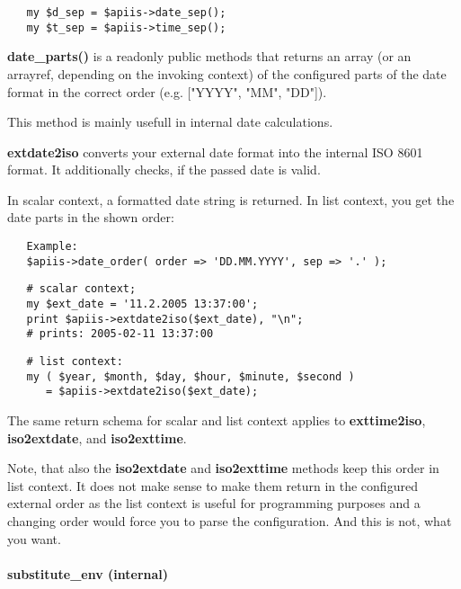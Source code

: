 \begin{verbatim}
   my $d_sep = $apiis->date_sep();
   my $t_sep = $apiis->time_sep();
\end{verbatim}


\textbf{date\_parts()} is a readonly public methods that returns an array (or an
arrayref, depending on the invoking context) of the configured parts of the
date format in the correct order (e.g. ["YYYY", "MM", "DD"]).



This method is mainly usefull in internal date calculations.



\textbf{extdate2iso} converts your external date format into the internal
ISO 8601 format.  It additionally checks, if the passed date is valid.



In scalar context, a formatted date string is returned. In list context,
you get the date parts in the shown order:

\begin{verbatim}
   Example:
   $apiis->date_order( order => 'DD.MM.YYYY', sep => '.' );
\end{verbatim}
\begin{verbatim}
   # scalar context;
   my $ext_date = '11.2.2005 13:37:00';
   print $apiis->extdate2iso($ext_date), "\n";
   # prints: 2005-02-11 13:37:00
\end{verbatim}
\begin{verbatim}
   # list context:
   my ( $year, $month, $day, $hour, $minute, $second )
      = $apiis->extdate2iso($ext_date);
\end{verbatim}


The same return schema for scalar and list context applies to
\textbf{exttime2iso}, \textbf{iso2extdate}, and \textbf{iso2exttime}.



Note, that also the \textbf{iso2extdate} and \textbf{iso2exttime} methods keep this order in
list context. It does not make sense to make them return in the configured
external order as the list context is useful for programming purposes and a
changing order would force you to parse the configuration. And this is not,
what you want.

\paragraph*{substitute\_env (internal)\label{Apiis::Init_--_Basic_initialisation_object_for_the_complete_APIIS_structure_substitute_env_internal_}}



